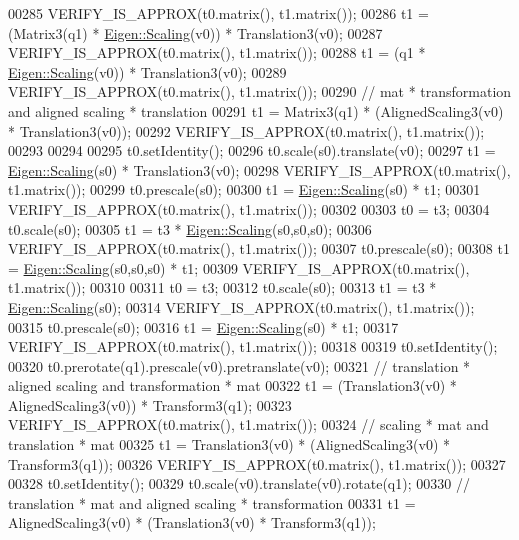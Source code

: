 \begin{DoxyCode}
00285   VERIFY\_IS\_APPROX(t0.matrix(), t1.matrix());
00286   t1 = (Matrix3(q1) * \hyperlink{group___geometry___module_ga23a8ed57e3f2973526026765ae697761}{Eigen::Scaling}(v0)) * Translation3(v0);
00287   VERIFY\_IS\_APPROX(t0.matrix(), t1.matrix());
00288   t1 = (q1 * \hyperlink{group___geometry___module_ga23a8ed57e3f2973526026765ae697761}{Eigen::Scaling}(v0)) * Translation3(v0);
00289   VERIFY\_IS\_APPROX(t0.matrix(), t1.matrix());
00290   \textcolor{comment}{// mat * transformation and aligned scaling * translation}
00291   t1 = Matrix3(q1) * (AlignedScaling3(v0) * Translation3(v0));
00292   VERIFY\_IS\_APPROX(t0.matrix(), t1.matrix());
00293 
00294 
00295   t0.setIdentity();
00296   t0.scale(s0).translate(v0);
00297   t1 = \hyperlink{group___geometry___module_ga23a8ed57e3f2973526026765ae697761}{Eigen::Scaling}(s0) * Translation3(v0);
00298   VERIFY\_IS\_APPROX(t0.matrix(), t1.matrix());
00299   t0.prescale(s0);
00300   t1 = \hyperlink{group___geometry___module_ga23a8ed57e3f2973526026765ae697761}{Eigen::Scaling}(s0) * t1;
00301   VERIFY\_IS\_APPROX(t0.matrix(), t1.matrix());
00302   
00303   t0 = t3;
00304   t0.scale(s0);
00305   t1 = t3 * \hyperlink{group___geometry___module_ga23a8ed57e3f2973526026765ae697761}{Eigen::Scaling}(s0,s0,s0);
00306   VERIFY\_IS\_APPROX(t0.matrix(), t1.matrix());
00307   t0.prescale(s0);
00308   t1 = \hyperlink{group___geometry___module_ga23a8ed57e3f2973526026765ae697761}{Eigen::Scaling}(s0,s0,s0) * t1;
00309   VERIFY\_IS\_APPROX(t0.matrix(), t1.matrix());
00310 
00311   t0 = t3;
00312   t0.scale(s0);
00313   t1 = t3 * \hyperlink{group___geometry___module_ga23a8ed57e3f2973526026765ae697761}{Eigen::Scaling}(s0);
00314   VERIFY\_IS\_APPROX(t0.matrix(), t1.matrix());
00315   t0.prescale(s0);
00316   t1 = \hyperlink{group___geometry___module_ga23a8ed57e3f2973526026765ae697761}{Eigen::Scaling}(s0) * t1;
00317   VERIFY\_IS\_APPROX(t0.matrix(), t1.matrix());
00318 
00319   t0.setIdentity();
00320   t0.prerotate(q1).prescale(v0).pretranslate(v0);
00321   \textcolor{comment}{// translation * aligned scaling and transformation * mat}
00322   t1 = (Translation3(v0) * AlignedScaling3(v0)) * Transform3(q1);
00323   VERIFY\_IS\_APPROX(t0.matrix(), t1.matrix());
00324   \textcolor{comment}{// scaling * mat and translation * mat}
00325   t1 = Translation3(v0) * (AlignedScaling3(v0) * Transform3(q1));
00326   VERIFY\_IS\_APPROX(t0.matrix(), t1.matrix());
00327 
00328   t0.setIdentity();
00329   t0.scale(v0).translate(v0).rotate(q1);
00330   \textcolor{comment}{// translation * mat and aligned scaling * transformation}
00331   t1 = AlignedScaling3(v0) * (Translation3(v0) * Transform3(q1));

\end{DoxyCode}
